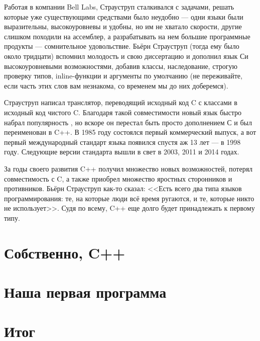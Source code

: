 \documentclass{article}
\begin{document}
Работая в компании Bell Labs, Страуструп сталкивался с задачами, решать которые уже существующими средствами было неудобно --- одни языки были выразительны, высокоуровневы и удобны, но им не хватало скорости, другие слишком походили на ассемблер, а разрабатывать на нем большие программные продукты --- сомнительное удовольствие. Бьёрн Страуструп (тогда ему было около тридцати) вспомнил молодость и свою диссертацию и дополнил язык Си высокоуровневыми возможностями, добавив классы, наследование, строгую проверку типов, inline-функции и аргументы по умолчанию (не переживайте, если часть этих слов вам незнакома, со временем мы до них доберемся).

Страуструп написал транслятор, переводящий исходный код C с классами в исходный код чистого C. Благодаря такой совместимости новый язык быстро набрал популярность , но вскоре он перестал быть просто дополнением С и был переименован в C++. В 1985 году состоялся первый коммерческий выпуск, а вот первый международный стандарт языка появился спустя аж 13 лет --- в 1998 году. Следующие версии стандарта вышли в свет в 2003, 2011 и 2014 годах.

За годы своего развития C++ получил множество новых возможностей, потерял совместимость с C, а также приобрел множество яростных сторонников и противников. Бьёрн Страуструп как-то сказал: <<Есть всего два типа языков программирования: те, на которые люди всё время ругаются, и те, которые никто не использует>>. Судя по всему, C++ еще долго будет принадлежать к первому типу.

\section{Собственно, C++}

\section{Наша первая программа}

\section{Итог}
\end{document}
